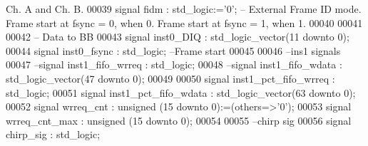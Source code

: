 \begin{DoxyCode}
{       Ch. A and Ch. B. }
00039     \textcolor{keywordflow}{signal} \textcolor{vhdlchar}{fidm}               \textcolor{vhdlchar}{:} \textcolor{comment}{std\_logic}\textcolor{vhdlchar}{:=}\textcolor{vhdlchar}{'}\textcolor{vhdllogic}{}\textcolor{vhdllogic}{0}\textcolor{vhdlchar}{'};\textcolor{keyword}{ -- External Frame ID mode. Frame start at fsync = 0, when
       0. Frame start at fsync = 1, when 1. }
00040    
00041    
00042 \textcolor{keyword}{    -- Data to BB}
00043     \textcolor{keywordflow}{signal} \textcolor{vhdlchar}{inst0_DIQ}            \textcolor{vhdlchar}{:} \textcolor{comment}{std\_logic\_vector}\textcolor{vhdlchar}{(}\textcolor{vhdllogic}{}\textcolor{vhdllogic}{11} \textcolor{keywordflow}{downto} \textcolor{vhdllogic}{}\textcolor{vhdllogic}{0}\textcolor{vhdlchar}{)};
00044     \textcolor{keywordflow}{signal} \textcolor{vhdlchar}{inst0_fsync}      \textcolor{vhdlchar}{:} \textcolor{comment}{std\_logic};\textcolor{keyword}{ --Frame start}
00045 
00046 \textcolor{keyword}{    --ins1 signals}
00047 \textcolor{keyword}{    --signal inst1\_fifo\_wrreq   : std\_logic;}
00048 \textcolor{keyword}{    --signal inst1\_fifo\_wdata : std\_logic\_vector(47 downto 0);}
00049    
00050    \textcolor{keywordflow}{signal} \textcolor{vhdlchar}{inst1_pct_fifo_wrreq}   \textcolor{vhdlchar}{:} \textcolor{comment}{std\_logic};
00051    \textcolor{keywordflow}{signal} \textcolor{vhdlchar}{inst1_pct_fifo_wdata}   \textcolor{vhdlchar}{:} \textcolor{comment}{std\_logic\_vector}\textcolor{vhdlchar}{(}\textcolor{vhdllogic}{}\textcolor{vhdllogic}{63} \textcolor{keywordflow}{downto} \textcolor{vhdllogic}{}\textcolor{vhdllogic}{0}\textcolor{vhdlchar}{)};
00052    \textcolor{keywordflow}{signal} \textcolor{vhdlchar}{wrreq_cnt}              \textcolor{vhdlchar}{:} \textcolor{comment}{unsigned} \textcolor{vhdlchar}{(}\textcolor{vhdllogic}{}\textcolor{vhdllogic}{15} \textcolor{keywordflow}{downto} \textcolor{vhdllogic}{}\textcolor{vhdllogic}{0}\textcolor{vhdlchar}{)}\textcolor{vhdlchar}{:=}\textcolor{vhdlchar}{(}\textcolor{keywordflow}{others}\textcolor{vhdlchar}{=}\textcolor{vhdlchar}{>}\textcolor{vhdlchar}{'}\textcolor{vhdllogic}{}\textcolor{vhdllogic}{0}\textcolor{vhdlchar}{'}\textcolor{vhdlchar}{)};
00053    \textcolor{keywordflow}{signal} \textcolor{vhdlchar}{wrreq_cnt_max}          \textcolor{vhdlchar}{:} \textcolor{comment}{unsigned} \textcolor{vhdlchar}{(}\textcolor{vhdllogic}{}\textcolor{vhdllogic}{15} \textcolor{keywordflow}{downto} \textcolor{vhdllogic}{}\textcolor{vhdllogic}{0}\textcolor{vhdlchar}{)};
00054     
00055 \textcolor{keyword}{    --chirp sig}
00056     \textcolor{keywordflow}{signal} \textcolor{vhdlchar}{chirp_sig}                    \textcolor{vhdlchar}{:} \textcolor{comment}{std\_logic};

\end{DoxyCode}
